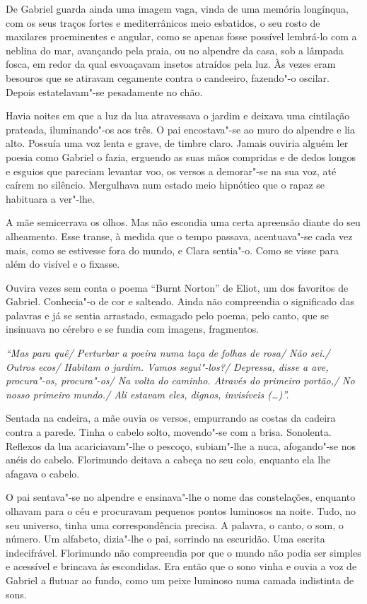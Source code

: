 De Gabriel guarda ainda uma imagem vaga, vinda de uma memória longínqua,
com os seus traços fortes e mediterrânicos meio esbatidos, o seu rosto
de maxilares proeminentes e angular, como se apenas fosse possível
lembrá-lo com a neblina do mar, avançando pela praia, ou no alpendre da
casa, sob a lâmpada fosca, em redor da qual esvoaçavam insetos atraídos
pela luz. Às vezes eram besouros que se atiravam cegamente contra o
candeeiro, fazendo"-o oscilar. Depois estatelavam"-se pesadamente no chão.

Havia noites em que a luz da lua atravessava o jardim e deixava uma
cintilação prateada, iluminando"-os aos três. O pai encostava"-se ao muro
do alpendre e lia alto. Possuía uma voz lenta e grave, de timbre claro.
Jamais ouviria alguém ler poesia como Gabriel o fazia, erguendo as suas
mãos compridas e de dedos longos e esguios que pareciam levantar voo, os
versos a demorar"-se na sua voz, até caírem no silêncio. Mergulhava num
estado meio hipnótico que o rapaz se habituara a ver"-lhe.

A mãe semicerrava os olhos. Mas não escondia uma certa apreensão diante
do seu alheamento. Esse transe, à medida que o tempo passava,
acentuava"-se cada vez mais, como se estivesse fora do mundo, e Clara
sentia"-o. Como se visse para além do visível e o fixasse.

Ouvira vezes sem conta o poema ``Burnt Norton'' de Eliot, um dos
favoritos de Gabriel. Conhecia"-o de cor e salteado. Ainda não
compreendia o significado das palavras e já se sentia arrastado,
esmagado pelo poema, pelo canto, que se insinuava no cérebro e se fundia
com imagens, fragmentos.

\emph{``Mas para quê/ Perturbar a poeira numa taça de folhas de rosa/
Não sei./ Outros ecos/ Habitam o jardim. Vamos segui"-los?/ Depressa,
disse a ave, procura"-os, procura"-os/ Na volta do caminho. Através do
primeiro portão,/ No nosso primeiro mundo./ Ali estavam eles, dignos,
invisíveis (\ldots{})''.}

Sentada na cadeira, a mãe ouvia os versos, empurrando as costas da
cadeira contra a parede. Tinha o cabelo solto, movendo"-se com a brisa.
Sonolenta. Reflexos da lua acariciavam"-lhe o pescoço, subiam"-lhe a nuca,
afogando"-se nos anéis do cabelo. Florimundo deitava a cabeça no seu
colo, enquanto ela lhe afagava o cabelo.

O pai sentava"-se no alpendre e ensinava"-lhe o nome das constelações,
enquanto olhavam para o céu e procuravam pequenos pontos luminosos na
noite. Tudo, no seu universo, tinha uma correspondência precisa. A
palavra, o canto, o som, o número. Um alfabeto, dizia"-lhe o pai,
sorrindo na escuridão. Uma escrita indecifrável. Florimundo não
compreendia por que o mundo não podia ser simples e acessível e brincava
às escondidas. Era então que o sono vinha e ouvia a voz de Gabriel a
flutuar ao fundo, como um peixe luminoso numa camada indistinta de sons.

